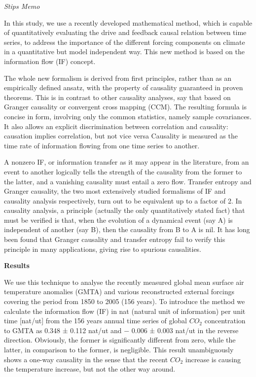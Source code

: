 \documentclass[
]{book}
\begin{document}
\emph{Stips Memo}

In this study, we use a recently developed mathematical
method, which is capable of quantitatively evaluating the drive and feedback causal relation between time
series, to address the importance of the different forcing components on climate in a quantitative but model
independent way. This new method is based on the information flow (IF) concept.

The whole new formalism is derived from first principles,
rather than as an empirically defined ansatz,
with the property of causality guaranteed in proven theorems.
This is in contrast to other causality analyses, say that based on
Granger causality or convergent cross mapping (CCM).
The resulting formula is concise in form, involving only the common
statistics, namely sample covariances.
It also allows an explicit discrimination between correlation and causality:
causation implies correlation, but not vice versa
Causality is measured as the
time rate of information flowing from one time series to another.

A nonzero IF, or information transfer as it may appear in the literature,
from an event to another logically tells the strength of the
causality from the former to the latter, and a vanishing causality must entail a zero flow.
Transfer entropy and Granger causality, the two most extensively studied formalisms
of IF and causality analysis respectively, turn out to be equivalent up to a factor of 2.
In causality analysis, a principle (actually the only quantitatively stated fact)
that must be verified is that,
when the evolution of a dynamical event (say A) is independent of another (say B),
then the causality from B to A is nil.
It has long been found that Granger causality and transfer entropy
fail to verify this principle in many applications, giving rise to spurious causalities.

\textbf{Results}

We use this technique to analyse the recently measured global mean surface air
temperature anomalies (GMTA) and various reconstructed external forcings covering
the period from 1850 to 2005 (156 years).
To introduce the method we calculate the information flow (IF) in nat
(natural unit of information) per unit time {[}nat/ut{]}
from the 156 years annual time series of global \(CO_2\) concentration to GMTA
as 0.348 ± 0.112 nat/ut and − 0.006 ± 0.003 nat/ut in the reverse direction.
Obviously, the former is significantly different from zero, while the latter,
in comparison to the former, is negligible.
This result unambiguously shows a one-way causality in the sense that the
recent \(CO_2\) increase is causing the temperature increase, but not the other way around.
\end{document}
